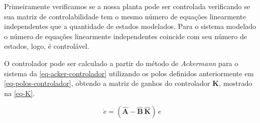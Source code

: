\documentclass[
	12pt,				%
	article,			%
	openright,			%
	oneside,
	a4paper,			%
	chapter=TITLE,		%
	section=TITLE,		%
	english,			%
	french,				%
	spanish,			%
	brazil,				%
]{abntex2}
\begin{document}
                Primeiramente verificamos se a nossa planta pode ser controlada verificando se sua matriz de controlabilidade tem o mesmo número de equações linearmente independentes que a quantidade de estados modelados. Para o sistema modelado o número de equações linearmente independentes coincide com seu número de estados, logo, é controlável.
            
                O controlador pode ser calculado a partir do método de \textit{Ackermann} para o sistema da \autoref{eq-acker-controlador} utilizando os polos definidos anteriormente em \autoref{eq-polos-controlador}, obtendo a matriz de ganhos do controlador \textbf{K}, mostrado na \autoref{eq-K}.
                
                \begin{equation}
                    \label{eq-acker-controlador}
                    \dot{e} = (\boldsymbol{\hat{A}} - \boldsymbol{\hat{B}}\,\boldsymbol{\hat{K}})\,e
                \end{equation}
                
\end{document}

